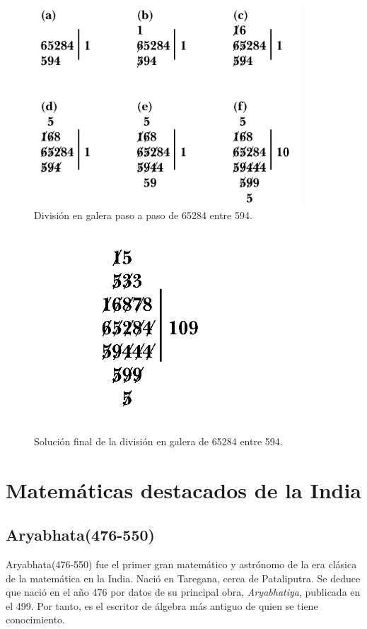 \documentclass[a4paper, 11pt]{article}
\begin{document}
		\begin{figure}[!ht]
			\centering
			\includegraphics[width = 10cm]{Galley_Method3.png}
			\caption{División en galera paso a paso de 65284 entre 594.}
			\label{fig:ind_division}
		\end{figure}

		\begin{figure}[!ht]
			\centering
			\includegraphics[width = 7cm]{Galley_Method4.png}
			\caption{Solución final de la división en galera de 65284 entre 594.}
			\label{fig:ind_division2}
		\end{figure}
		
\section{Matemáticas destacados de la India}
	\subsection{Aryabhata(476-550)}
		Aryabhata(476-550) fue el primer gran matemático y astrónomo de la era clásica de la matemática en la India.
		Nació en Taregana, cerca de Pataliputra. Se deduce que nació en el año 476 por datos de su principal obra,
		\textit{Aryabhatiya}, publicada en el 499. Por tanto, es el escritor de álgebra más antiguo de quien se tiene
		conocimiento.
		
\end{document}
